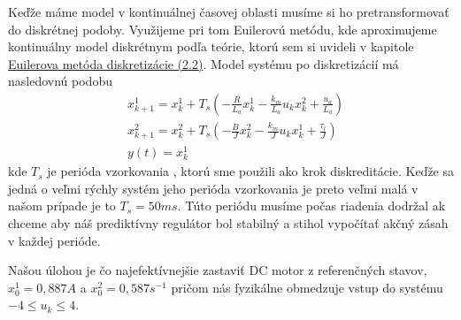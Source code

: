 Keďže máme model v kontinuálnej časovej oblasti musíme si ho pretransformovať do diskrétnej podoby. Využijeme pri tom Euilerovú metódu, kde aproximujeme kontinuálny model diskrétnym podľa teórie, ktorú sem si uvideli v kapitole \hyperref[se:diskretizacia]{Euilerova metóda diskretizácie (2.2)}. Model systému po diskretizácií má nasledovnú podobu
\begin{align}
& x_{k+1}^{1} = x^{1}_{k}+T_{s}\left(- \frac{R}{L_{a}}x^{1}_{k} - \frac{k_{m}}{L_{a}}u_{k}x^{2}_{k} + \frac{u_a}{L_a}\right)\\
& x_{k+1}^{2} = x^{2}_{k}+T_{s}\left(- \frac{B}{J}x^{2}_{k} - \frac{k_{m}}{J}u_{k}x^{1}_{k} + \frac{\tau_l}{J}\right)\\
& y(t) = x^{1}_{k}
\end{align}
kde $T_{s}$ je perióda vzorkovania , ktorú sme použili ako krok diskreditácie. Keďže sa jedná o veľmi rýchly systém jeho perióda vzorkovania je preto veľmi malá v našom prípade je to $T_{s} = 50ms$. Túto periódu musíme počas riadenia dodržal ak chceme aby náš prediktívny regulátor bol stabilný a stihol vypočítať akčný zásah v každej perióde.

Našou úlohou je čo najefektívnejšie zastaviť DC motor z referenčných stavov, $x_{0}^{1}=0,887 A$ a $x_{0}^{2}=0,587 s^{-1}$ pričom nás fyzikálne obmedzuje vstup do systému $-4 \leq u_{k} \leq 4$. 

